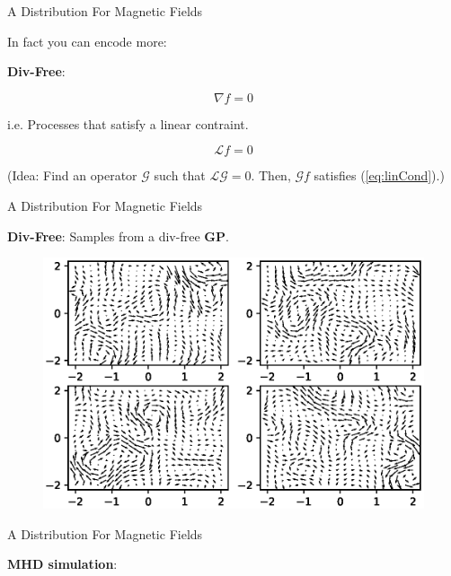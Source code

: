 \documentclass{beamer}
\begin{document}
\begin{frame}{A Distribution For Magnetic Fields}

  In fact you can encode more:

  \vspace{1em}

  \textbf{Div-Free}:

  \begin{equation*}
    \nabla f = 0
  \end{equation*}

  i.e. Processes that satisfy a linear contraint.

  \begin{equation}\label{eq:linCond}
    \mathcal{L}f = 0
  \end{equation}

  (Idea: Find an operator $\mathcal{G}$ such that $\mathcal{L}\mathcal{G} = 0$. Then, $\mathcal{G}f$ satisfies (\ref{eq:linCond}).)
\end{frame}

\begin{frame}{A Distribution For Magnetic Fields}

  \textbf{Div-Free}: Samples from a div-free \textbf{GP}.

  \begin{figure}
    \includegraphics[width=\linewidth]{plots/div_free.eps}
  \end{figure}

\end{frame}

\begin{frame}{A Distribution For Magnetic Fields}

  \textbf{MHD simulation}:

  \begin{center}
  \end{center}

\end{frame}
\end{document}
